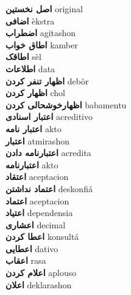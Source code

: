 \textbf{ اصل نخستین  } original \\
\textbf{ اضافی  } èkstra \\
\textbf{ اضطراب  } agitashon \\
\textbf{ اطاق خواب  } kamber \\
\textbf{ اطاقک  } sèl \\
\textbf{ اطلاعات  } data \\
\textbf{ اظهار تنفر کردن  } debòr \\
\textbf{ اظهار کردن  } chol \\
\textbf{ اظهارخوشحالی کردن  } babamentu \\
\textbf{ اعتبار اسنادی  } acreditivo \\
\textbf{ اعتبار نامه  } akto \\
\textbf{ اعتبار  } atmirashon \\
\textbf{ اعتبارنامه دادن  } acredita \\
\textbf{ اعتبارنامه  } akto \\
\textbf{ اعتقاد  } aceptacion \\
\textbf{ اعتماد نداشتن  } deskonfiá \\
\textbf{ اعتماد  } aceptacion \\
\textbf{ اعتیاد  } dependensia \\
\textbf{ اعشاری  } decimal \\
\textbf{ اعطا کردن  } konsultá \\
\textbf{ اعطایی  } dativo \\
\textbf{ اعقاب  } rasa \\
\textbf{ اعلام کردن  } aplouso \\
\textbf{ اعلان  } deklarashon \\
